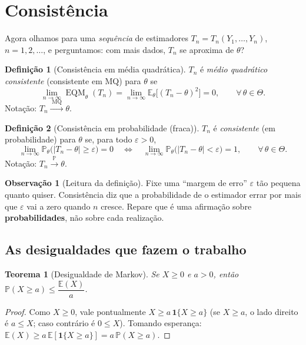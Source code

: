 \documentclass[11pt,a4paper]{article}
\theoremstyle{definition}
\newtheorem{definicao}{Definição}[section]
\newtheorem{observacao}{Observação}[section]
\theoremstyle{plain}
\newtheorem{teorema}{Teorema}[section]
\newcommand{\E}{\mathbb{E}}
\newcommand{\EQM}{\operatorname{EQM}}
\newcommand{\Prob}{\mathbb{P}}
\newcommand{\ind}{\mathbf{1}}
\newcommand{\convP}{\xrightarrow{\;\Prob\;}}
\newcommand{\convMQ}{\xrightarrow{\;\text{MQ}\;}}
\begin{document}
\section{Consistência}

Agora olhamos para uma \emph{sequência} de estimadores $T_n=T_n(Y_1,\dots,Y_n)$, $n=1,2,\dots$, e perguntamos: com mais dados, $T_n$ se aproxima de $\theta$?

\begin{definicao}[Consistência em média quadrática]
$T_n$ é \emph{médio quadrático consistente} (consistente em MQ) para $\theta$ se
\[
\lim_{n\to\infty}\EQM_\theta(T_n)=\lim_{n\to\infty}\E_\theta\big[(T_n-\theta)^2\big]=0,\qquad\forall\,\theta\in\Theta .
\]
Notação: $T_n\convMQ\theta$.
\end{definicao}

\begin{definicao}[Consistência em probabilidade (fraca)]
$T_n$ é \emph{consistente} (em probabilidade) para $\theta$ se, para todo $\varepsilon>0$,
\[
\lim_{n\to\infty}\Prob_\theta\big(|T_n-\theta|\ge\varepsilon\big)=0
\quad\Longleftrightarrow\quad
\lim_{n\to\infty}\Prob_\theta\big(|T_n-\theta|<\varepsilon\big)=1,
\qquad\forall\,\theta\in\Theta .
\]
Notação: $T_n\convP\theta$.
\end{definicao}

\begin{observacao}[Leitura da definição]
Fixe uma ``margem de erro'' $\varepsilon$ tão pequena quanto quiser. Consistência diz que a probabilidade de o estimador errar por mais que $\varepsilon$ vai a zero quando $n$ cresce. Repare que é uma afirmação sobre \textbf{probabilidades}, não sobre cada realização.
\end{observacao}

\subsection{As desigualdades que fazem o trabalho}

\begin{teorema}[Desigualdade de Markov]
Se $X\ge 0$ e $a>0$, então $\Prob(X\ge a)\le \dfrac{\E(X)}{a}$.
\end{teorema}
\begin{proof}
Como $X\ge 0$, vale pontualmente $X\ge a\,\ind\{X\ge a\}$ (se $X\ge a$, o lado direito é $a\le X$; caso contrário é $0\le X$). Tomando esperança: $\E(X)\ge a\,\E[\ind\{X\ge a\}]=a\,\Prob(X\ge a)$.
\end{proof}
\end{document}
